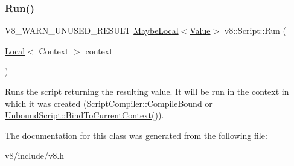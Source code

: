 \subsubsection{\texorpdfstring{Run()}{Run()}}
{\footnotesize\ttfamily V8\+\_\+\+W\+A\+R\+N\+\_\+\+U\+N\+U\+S\+E\+D\+\_\+\+R\+E\+S\+U\+LT \mbox{\hyperlink{classv8_1_1MaybeLocal}{Maybe\+Local}}$<$\mbox{\hyperlink{classv8_1_1Value}{Value}}$>$ v8\+::\+Script\+::\+Run (\begin{DoxyParamCaption}\item[{\mbox{\hyperlink{classv8_1_1Local}{Local}}$<$ Context $>$}]{context }\end{DoxyParamCaption})}

Runs the script returning the resulting value. It will be run in the context in which it was created (Script\+Compiler\+::\+Compile\+Bound or \mbox{\hyperlink{classv8_1_1UnboundScript_a0f3354dc71e3f831d10f6e82704a4c2b}{Unbound\+Script\+::\+Bind\+To\+Current\+Context()}}). 

The documentation for this class was generated from the following file\+:\begin{DoxyCompactItemize}
\item 
v8/include/v8.\+h\end{DoxyCompactItemize}
